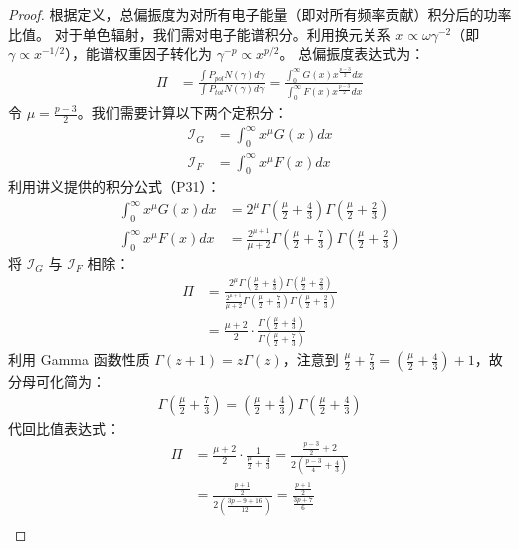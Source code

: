 \documentclass[12pt,oneside]{ctexart}
\theoremstyle{definition}
\theoremstyle{plain}
\theoremstyle{remark}
\begin{document}
\begin{proof}
根据定义，总偏振度为对所有电子能量（即对所有频率贡献）积分后的功率比值。
对于单色辐射，我们需对电子能谱积分。利用换元关系 $x \propto \omega \gamma^{-2}$（即 $\gamma \propto x^{-1/2}$），能谱权重因子转化为 $\gamma^{-p} \propto x^{p/2}$。
总偏振度表达式为：
\begin{align}
    \Pi &= \frac{\int P_{pol} N(\gamma) d\gamma}{\int P_{tot} N(\gamma) d\gamma} 
         = \frac{\int_0^\infty G(x) x^{\frac{p-3}{2}} dx}{\int_0^\infty F(x) x^{\frac{p-3}{2}} dx}
\end{align}
令 $\mu = \frac{p-3}{2}$。我们需要计算以下两个定积分：
\begin{align}
    \mathcal{I}_G &= \int_0^\infty x^\mu G(x) dx \\
    \mathcal{I}_F &= \int_0^\infty x^\mu F(x) dx
\end{align}
利用讲义提供的积分公式（P31）：
\begin{align}
    \int_0^\infty x^\mu G(x) dx &= 2^\mu \Gamma\left(\frac{\mu}{2} + \frac{4}{3}\right) \Gamma\left(\frac{\mu}{2} + \frac{2}{3}\right) \\
    \int_0^\infty x^\mu F(x) dx &= \frac{2^{\mu+1}}{\mu+2} \Gamma\left(\frac{\mu}{2} + \frac{7}{3}\right) \Gamma\left(\frac{\mu}{2} + \frac{2}{3}\right)
\end{align}
将 $\mathcal{I}_G$ 与 $\mathcal{I}_F$ 相除：
\begin{align}
    \Pi &= \frac{2^\mu \Gamma(\frac{\mu}{2} + \frac{4}{3}) \Gamma(\frac{\mu}{2} + \frac{2}{3})} 
             {\frac{2^{\mu+1}}{\mu+2} \Gamma(\frac{\mu}{2} + \frac{7}{3}) \Gamma(\frac{\mu}{2} + \frac{2}{3})} \\
        &= \frac{\mu+2}{2} \cdot \frac{\Gamma(\frac{\mu}{2} + \frac{4}{3})}{\Gamma(\frac{\mu}{2} + \frac{7}{3})}
\end{align}
利用 Gamma 函数性质 $\Gamma(z+1) = z \Gamma(z)$，注意到 $\frac{\mu}{2} + \frac{7}{3} = (\frac{\mu}{2} + \frac{4}{3}) + 1$，故分母可化简为：
\begin{align}
    \Gamma\left(\frac{\mu}{2} + \frac{7}{3}\right) = \left(\frac{\mu}{2} + \frac{4}{3}\right) \Gamma\left(\frac{\mu}{2} + \frac{4}{3}\right)
\end{align}
代回比值表达式：
\begin{align}
    \Pi &= \frac{\mu+2}{2} \cdot \frac{1}{\frac{\mu}{2} + \frac{4}{3}} 
         = \frac{\frac{p-3}{2} + 2}{2 (\frac{p-3}{4} + \frac{4}{3})} \\
        &= \frac{\frac{p+1}{2}}{2 (\frac{3p-9+16}{12})} 
         = \frac{\frac{p+1}{2}}{\frac{3p+7}{6}} \\

\end{align}
\end{proof}
\end{document}
